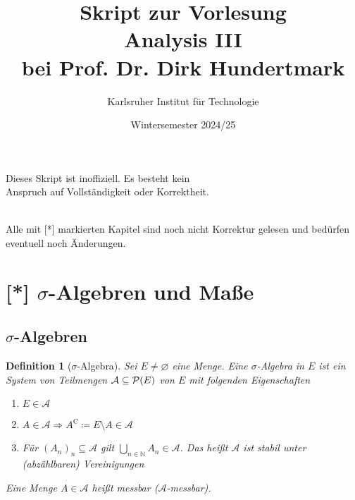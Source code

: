 \documentclass[11pt, twoside, a4paper]{article}
\theoremstyle{plain}
\newtheorem{definition}[blockelement]{Definition}
\numberwithin{equation}{subsection}
\newcommand{\of}[1]{\mathopen{}\mathclose{}\bgroup\left(#1\aftergroup\egroup\right)}
\newcommand{\impl}[0]{\Rightarrow{}}
\renewcommand{\emptyset}{\varnothing}
\newcommand{\dsty}{\displaystyle}
\newcommand{\N}{\mathbb{N}}
\begin{document}
    \title{\vspace{3cm} Skript zur Vorlesung\\Analysis III\\bei Prof. Dr. Dirk Hundertmark}
    \author{Karlsruher Institut für Technologie}
    \date{Wintersemester 2024/25}
    \maketitle
    \begin{center}
        Dieses Skript ist inoffiziell. Es besteht kein\\Anspruch auf Vollständigkeit oder Korrektheit.
    \end{center}
    \thispagestyle{empty}
    \newpage

    \tableofcontents
    ~\\
    Alle mit [*] markierten Kapitel sind noch nicht Korrektur gelesen und bedürfen eventuell noch Änderungen.

    \newpage


    


    \section{[*] $\sigma$-Algebren und Maße}

    \subsection{$\sigma$-Algebren}
    \thispagestyle{pagenumberonly}

    \begin{definition}[$\sigma$-Algebra]
        Sei $E\neq \emptyset$ eine Menge. Eine $\sigma$-Algebra in $E$ ist ein System von Teilmengen $\mathcal{A} \subseteq \mathcal{P}\of{E}$ von $E$ mit folgenden Eigenschaften
        \begin{enumerate}[label=($\Sigma_{\arabic*}$)]
            \item $E\in\mathcal{A}$
            \item $A\in\mathcal{A} \impl A^{\mathrm{C}} \coloneqq E \setminus A \in\mathcal{A}$
            \item Für $(A_n)_n\subseteq\mathcal{A}$ gilt $\dsty\bigcup_{n\in\N} A_n \in\mathcal{A}$. Das heißt $\mathcal{A}$ ist stabil unter (abzählbaren) Vereinigungen
        \end{enumerate}
        Eine Menge $A\in\mathcal{A}$ heißt messbar ($\mathcal{A}$-messbar).
    \end{definition}
\end{document}
